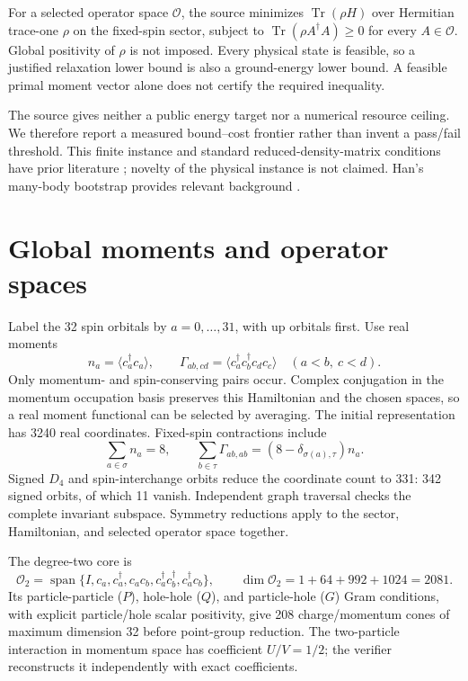 \documentclass[11pt]{article}
\newcommand{\Tr}{\operatorname{Tr}}
\newcommand{\Span}{\operatorname{span}}
\begin{document}
For a selected operator space $\mathcal O$, the source minimizes $\Tr(\rho H)$ over Hermitian trace-one $\rho$ on the fixed-spin sector, subject to $\Tr(\rho A^\dagger A)\ge0$ for every $A\in\mathcal O$. Global positivity of $\rho$ is not imposed. Every physical state is feasible, so a justified relaxation lower bound is also a ground-energy lower bound. A feasible primal moment vector alone does not certify the required inequality.

The source gives neither a public energy target nor a numerical resource ceiling. We therefore report a measured bound--cost frontier rather than invent a pass/fail threshold. This finite instance and standard reduced-density-matrix conditions have prior literature \cite{anderson}; novelty of the physical instance is not claimed. Han's many-body bootstrap provides relevant background \cite{han}.

\section{Global moments and operator spaces}
Label the 32 spin orbitals by $a=0,\ldots,31$, with up orbitals first. Use real moments
\begin{equation}
 n_a=\langle c_a^\dagger c_a\rangle,\qquad
 \Gamma_{ab,cd}=\langle c_a^\dagger c_b^\dagger c_d c_c\rangle\quad(a<b,\ c<d).
\end{equation}
Only momentum- and spin-conserving pairs occur. Complex conjugation in the momentum occupation basis preserves this Hamiltonian and the chosen spaces, so a real moment functional can be selected by averaging. The initial representation has 3240 real coordinates. Fixed-spin contractions include
\begin{equation}
 \sum_{a\in\sigma}n_a=8,\qquad
 \sum_{b\in\tau}\Gamma_{ab,ab}=(8-\delta_{\sigma(a),\tau})n_a.
\end{equation}
Signed $D_4$ and spin-interchange orbits reduce the coordinate count to 331: 342 signed orbits, of which 11 vanish. Independent graph traversal checks the complete invariant subspace. Symmetry reductions apply to the sector, Hamiltonian, and selected operator space together.

The degree-two core is
\begin{equation}
\mathcal O_2=\Span\{I,c_a,c_a^\dagger,c_ac_b,c_a^\dagger c_b^\dagger,c_a^\dagger c_b\},
\qquad \dim\mathcal O_2=1+64+992+1024=2081.
\end{equation}
Its particle-particle ($P$), hole-hole ($Q$), and particle-hole ($G$) Gram conditions, with explicit particle/hole scalar positivity, give 208 charge/momentum cones of maximum dimension 32 before point-group reduction. The two-particle interaction in momentum space has coefficient $U/V=1/2$; the verifier reconstructs it independently with exact coefficients.
\end{document}
